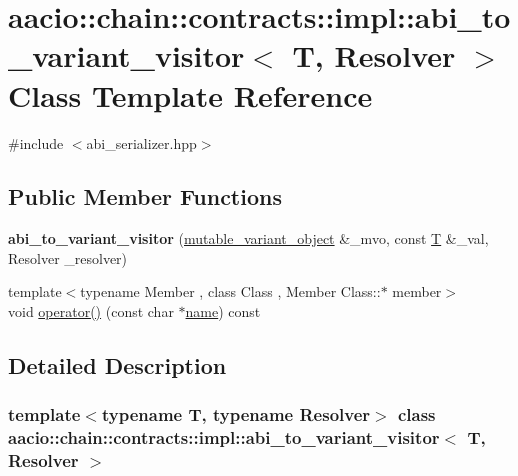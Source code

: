 \hypertarget{classaacio_1_1chain_1_1contracts_1_1impl_1_1abi__to__variant__visitor}{}\section{aacio\+:\+:chain\+:\+:contracts\+:\+:impl\+:\+:abi\+\_\+to\+\_\+variant\+\_\+visitor$<$ T, Resolver $>$ Class Template Reference}
\label{classaacio_1_1chain_1_1contracts_1_1impl_1_1abi__to__variant__visitor}


{\ttfamily \#include $<$abi\+\_\+serializer.\+hpp$>$}

\subsection*{Public Member Functions}
\begin{DoxyCompactItemize}
\item 
\mbox{\label{classaacio_1_1chain_1_1contracts_1_1impl_1_1abi__to__variant__visitor_aa33997306b5d90a6436cf38edf38bbfd}} 
{\bfseries abi\+\_\+to\+\_\+variant\+\_\+visitor} (\mbox{\hyperlink{classfc_1_1mutable__variant__object}{mutable\+\_\+variant\+\_\+object}} \&\+\_\+mvo, const \mbox{\hyperlink{struct_t}{T}} \&\+\_\+val, Resolver \+\_\+resolver)
\item 
{\footnotesize template$<$typename Member , class Class , Member Class\+::$\ast$ member$>$ }\\void \mbox{\hyperlink{classaacio_1_1chain_1_1contracts_1_1impl_1_1abi__to__variant__visitor_ad8922a03f91656c01dfd7e4324e778b3}{operator()}} (const char $\ast$\mbox{\hyperlink{structaacio_1_1chain_1_1name}{name}}) const
\end{DoxyCompactItemize}


\subsection{Detailed Description}
\subsubsection*{template$<$typename T, typename Resolver$>$\newline
class aacio\+::chain\+::contracts\+::impl\+::abi\+\_\+to\+\_\+variant\+\_\+visitor$<$ T, Resolver $>$}

